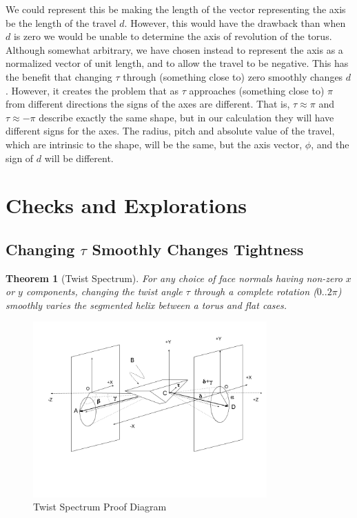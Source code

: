 \documentclass[11pt]{article}
\newtheorem{theorem}{Theorem}
\begin{document}
{We could represent this be making the length of the vector representing the axis be the length of the
travel $d$. However, this would have the drawback than when $d$ is zero we would be unable to determine
the axis of revolution of the torus. Although somewhat arbitrary, we have chosen instead to represent the
axis as a normalized vector of unit length, and to allow the travel to be negative. This has the benefit that
changing $\tau$ through (something close to) zero smoothly changes $d$. However, it creates the problem that as $\tau$ approaches
(something close to) $\pi$ from different directions the signs of the axes are different.
That is, $\tau \approx \pi$ and $\tau \approx -\pi$ describe exactly
the same shape, but in our calculation they will have different signs for the axes. The radius, pitch and
absolute value of the travel,
which are intrinsic to the shape, will be the same, but the axis vector, $\phi$, and the sign of $d$ will be different.

\section{Checks and Explorations}

\subsection{Changing $\tau$ Smoothly Changes Tightness}

\begin{theorem}[Twist Spectrum]
  For any choice of face normals having non-zero $x$ or $y$ components,
  changing the twist angle $\tau$ through a complete rotation ($0..2\pi$)
  smoothly varies the segmented helix
  between a torus and flat cases.
\end{theorem}

\begin{figure}
     \centering
     \includegraphics[width=0.80\textwidth]{figures/TwistSpectrumProof.png}
     \caption{Twist Spectrum Proof Diagram}
  \label{fig:twistspectrum}
\end{figure}


}
\end{document}
